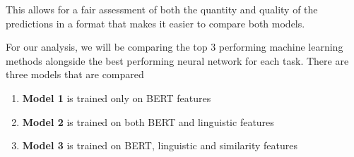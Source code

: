 \documentclass{article}
\begin{document}
This allows for a fair assessment of both the quantity and quality of the predictions in a format that makes it easier to compare both models.

For our analysis, we will be comparing the top 3 performing machine learning methods alongside the best performing neural network for each task. There are three models that are compared

\begin{enumerate}
  \item \textbf{Model 1} is trained only on BERT features
  \item \textbf{Model 2} is trained on both BERT and linguistic features
  \item \textbf{Model 3} is trained on BERT, linguistic and similarity features
\end{enumerate}
\end{document}
